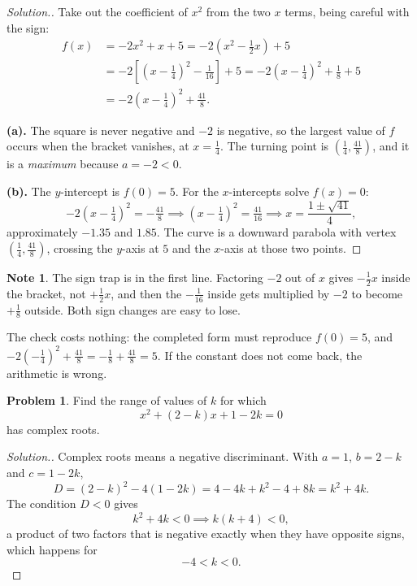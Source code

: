 \documentclass[11pt,a4paper]{article}
\theoremstyle{definition}
\newtheorem{note}[thm]{Note}
\newtheorem{problemx}{Problem}[section]
\newenvironment{problem}{\begin{problemx}}{\end{problemx}}
\newenvironment{solution}
  {\renewcommand{\qedsymbol}{}\begin{proof}[\textit{Solution}.]}
  {\end{proof}}
\begin{document}
\begin{solution}
Take out the coefficient of $x^{2}$ from the two $x$ terms, being careful with the
sign:
\begin{align*}
f(x)&=-2x^{2}+x+5
     =-2\left(x^{2}-\tfrac{1}{2}x\right)+5\\
    &=-2\left[\left(x-\tfrac{1}{4}\right)^{2}-\tfrac{1}{16}\right]+5
     =-2\left(x-\tfrac{1}{4}\right)^{2}+\tfrac{1}{8}+5\\
    &=-2\left(x-\tfrac{1}{4}\right)^{2}+\tfrac{41}{8}.
\end{align*}

\textbf{(a).} The square is never negative and $-2$ is negative, so the largest
value of $f$ occurs when the bracket vanishes, at $x=\frac{1}{4}$. The turning
point is $\left(\frac{1}{4},\frac{41}{8}\right)$, and it is a \emph{maximum}
because $a=-2<0$.

\textbf{(b).} The $y$-intercept is $f(0)=5$. For the $x$-intercepts solve
$f(x)=0$:
$$-2\left(x-\tfrac{1}{4}\right)^{2}=-\tfrac{41}{8}
\implies \left(x-\tfrac{1}{4}\right)^{2}=\tfrac{41}{16}
\implies x=\frac{1\pm\sqrt{41}}{4},$$
approximately $-1.35$ and $1.85$. The curve is a downward parabola with vertex
$\left(\frac{1}{4},\frac{41}{8}\right)$, crossing the $y$-axis at $5$ and the
$x$-axis at those two points.
\end{solution}

\begin{note}
The sign trap is in the first line. Factoring $-2$ out of $x$ gives
$-\frac{1}{2}x$ inside the bracket, not $+\frac{1}{2}x$, and then the $-\frac{1}{16}$
inside gets multiplied by $-2$ to become $+\frac{1}{8}$ outside. Both sign changes
are easy to lose.

The check costs nothing: the completed form must reproduce $f(0)=5$, and
$-2\left(-\frac{1}{4}\right)^{2}+\frac{41}{8}=-\frac{1}{8}+\frac{41}{8}=5$. If the
constant does not come back, the arithmetic is wrong.
\end{note}

\pagebreak

\begin{problem}
Find the range of values of $k$ for which
$$x^{2}+(2-k)x+1-2k=0$$
has complex roots.
\end{problem}

\begin{solution}
Complex roots means a negative discriminant. With $a=1$, $b=2-k$ and $c=1-2k$,
$$D=(2-k)^{2}-4(1-2k)=4-4k+k^{2}-4+8k=k^{2}+4k .$$
The condition $D<0$ gives
$$k^{2}+4k<0 \implies k(k+4)<0 ,$$
a product of two factors that is negative exactly when they have opposite signs,
which happens for
$$-4<k<0 .$$
\end{solution}
\end{document}
